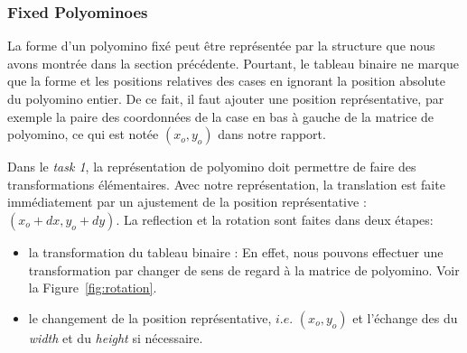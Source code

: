 \documentclass[a4paper,12pt]{article}
\begin{document}
	\subsubsection{Fixed Polyominoes}
	\par La forme d'un polyomino fixé peut être représentée par la structure que nous avons montrée dans la section précédente. Pourtant, le tableau binaire ne marque que la forme et les positions relatives des cases en ignorant la position absolute du polyomino entier. De ce fait, il faut ajouter une position représentative, par exemple la paire des coordonnées de la case en bas à gauche de la matrice de polyomino, ce qui est notée $(x_{o}, y_{o})$ dans notre rapport.
	\par Dans le \textit{task 1}, la représentation de polyomino doit permettre de faire des transformations élémentaires. Avec notre représentation, la translation est faite immédiatement par un ajustement de la position représentative : $(x_{o}+dx, y_{o}+dy)$. La reflection et la rotation sont faites dans deux étapes:
	\begin{itemize}
		\item la transformation du tableau binaire : En effet, nous pouvons effectuer une transformation par changer de sens de regard à la matrice de polyomino. Voir la Figure~\ref{fig:rotation}.
		\item le changement de la position représentative, $i.e.$ $(x_{o}, y_{o})$ et l'échange des du \textit{width} et du \textit{height} si nécessaire.
	\end{itemize}
\end{document}
